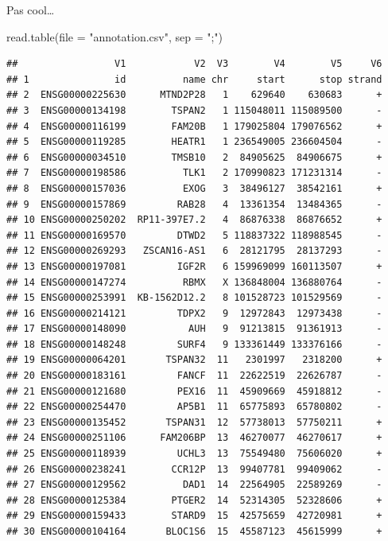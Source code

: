 \documentclass[
]{book}
\newenvironment{Shaded}{\begin{snugshade}}{\end{snugshade}}
\newcommand{\AttributeTok}[1]{\textcolor[rgb]{0.77,0.63,0.00}{#1}}
\newcommand{\FunctionTok}[1]{\textcolor[rgb]{0.00,0.00,0.00}{#1}}
\newcommand{\NormalTok}[1]{#1}
\newcommand{\StringTok}[1]{\textcolor[rgb]{0.31,0.60,0.02}{#1}}
\begin{document}
Pas cool\ldots{}

\begin{Shaded}
\begin{Highlighting}[]
\FunctionTok{read.table}\NormalTok{(}\AttributeTok{file =} \StringTok{"annotation.csv"}\NormalTok{, }\AttributeTok{sep =} \StringTok{";"}\NormalTok{)  }
\end{Highlighting}
\end{Shaded}

\begin{verbatim}
##                 V1            V2  V3        V4        V5     V6
## 1               id          name chr     start      stop strand
## 2  ENSG00000225630      MTND2P28   1    629640    630683      +
## 3  ENSG00000134198        TSPAN2   1 115048011 115089500      -
## 4  ENSG00000116199        FAM20B   1 179025804 179076562      +
## 5  ENSG00000119285        HEATR1   1 236549005 236604504      -
## 6  ENSG00000034510        TMSB10   2  84905625  84906675      +
## 7  ENSG00000198586          TLK1   2 170990823 171231314      -
## 8  ENSG00000157036          EXOG   3  38496127  38542161      +
## 9  ENSG00000157869         RAB28   4  13361354  13484365      -
## 10 ENSG00000250202  RP11-397E7.2   4  86876338  86876652      +
## 11 ENSG00000169570         DTWD2   5 118837322 118988545      -
## 12 ENSG00000269293   ZSCAN16-AS1   6  28121795  28137293      -
## 13 ENSG00000197081         IGF2R   6 159969099 160113507      +
## 14 ENSG00000147274          RBMX   X 136848004 136880764      -
## 15 ENSG00000253991  KB-1562D12.2   8 101528723 101529569      -
## 16 ENSG00000214121         TDPX2   9  12972843  12973438      -
## 17 ENSG00000148090           AUH   9  91213815  91361913      -
## 18 ENSG00000148248         SURF4   9 133361449 133376166      -
## 19 ENSG00000064201       TSPAN32  11   2301997   2318200      +
## 20 ENSG00000183161         FANCF  11  22622519  22626787      -
## 21 ENSG00000121680         PEX16  11  45909669  45918812      -
## 22 ENSG00000254470         AP5B1  11  65775893  65780802      -
## 23 ENSG00000135452       TSPAN31  12  57738013  57750211      +
## 24 ENSG00000251106      FAM206BP  13  46270077  46270617      +
## 25 ENSG00000118939         UCHL3  13  75549480  75606020      +
## 26 ENSG00000238241        CCR12P  13  99407781  99409062      -
## 27 ENSG00000129562          DAD1  14  22564905  22589269      -
## 28 ENSG00000125384        PTGER2  14  52314305  52328606      +
## 29 ENSG00000159433        STARD9  15  42575659  42720981      +
## 30 ENSG00000104164       BLOC1S6  15  45587123  45615999      +

\end{verbatim}
\end{document}
